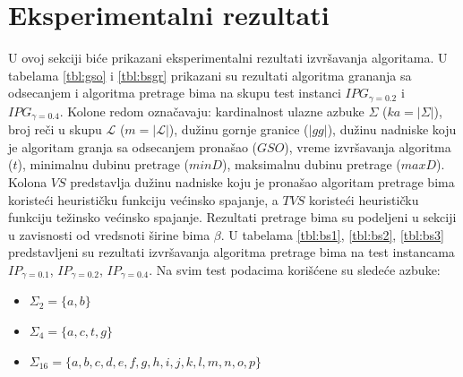 \documentclass[12pt,oneside]{memoir}
\begin{document}
\section{Eksperimentalni rezultati}
\label{sec:ekspRezultati}
U ovoj sekciji biće prikazani eksperimentalni rezultati izvršavanja algoritama.
U tabelama \ref{tbl:gso} i \ref{tbl:bsgr} prikazani su rezultati algoritma grananja sa odsecanjem
i algoritma pretrage bima
na skupu test instanci $IPG_{\gamma=0.2}$ i $IPG_{\gamma=0.4}$. 
Kolone redom označavaju: kardinalnost ulazne azbuke $\Sigma$ ($ka=|\Sigma|$),
broj reči u skupu $\mathcal{L}$ ($m=|\mathcal{L}|$), dužinu gornje granice ($|gg|$),
dužinu nadniske koju je algoritam granja sa odsecanjem pronašao ($GSO$),
vreme izvršavanja algoritma ($t$),
minimalnu dubinu pretrage ($minD$),
maksimalnu dubinu pretrage ($maxD$).
Kolona $VS$ predstavlja
dužinu nadniske koju je pronašao algoritam pretrage bima koristeći
heurističku funkciju većinsko spajanje, a $TVS$ koristeći
heurističku funkciju težinsko većinsko spajanje.
Rezultati pretrage bima su podeljeni u sekciji u zavisnosti od
vredsnoti širine bima $\beta$.
U tabelama \ref{tbl:bs1}, \ref{tbl:bs2}, \ref{tbl:bs3} predstavljeni su rezultati
izvršavanja algoritma pretrage bima na test instancama
$IP_{\gamma=0.1}$, $IP_{\gamma=0.2}$, $IP_{\gamma=0.4}$.
Na svim test podacima korišćene su sledeće azbuke:
\begin{itemize}
  \item $\Sigma_{2}=\{a,b\}$
  \item $\Sigma_{4}=\{a,c,t,g\}$
  \item $\Sigma_{16}=\{a,b,c,d,e,f,g,h,i,j,k,l,m,n,o,p\}$
\end{itemize}
\end{document}

